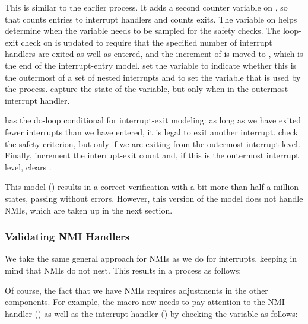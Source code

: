 \begin{fcvref}
This is similar to the earlier  process.
It adds a second counter variable  on , so that
 counts entries to interrupt handlers and 
counts exits.
The  variable on  helps determine
when the  variable needs to be sampled
for the safety checks.
The loop-exit check on  is updated to require that the
specified number of interrupt handlers are exited as well as entered,
and the increment of  is moved to , which is
the end of the interrupt-entry model.
 set the  variable to indicate
whether this is the outermost of a set of nested interrupts and to
set the  variable that is used by the
 process.
 capture the state of the 
variable, but only when in the outermost interrupt handler.

 has the do-loop conditional for interrupt-exit modeling:
as long as we have exited fewer interrupts than we have entered, it is
legal to exit another interrupt.
check the safety criterion, but only if we are exiting
from the outermost interrupt level.
Finally,  increment the interrupt-exit count 
and, if this is the outermost interrupt level, clears
.
\end{fcvref}

This model ()
results in a correct verification with a bit more than half a million
states, passing without errors.
However, this version of the model does not handle NMIs,
which are taken up in the next section.

\subsubsection{Validating NMI Handlers}
\label{sec:formal:Validating NMI Handlers}

We take the same general approach for NMIs as we do for interrupts,
keeping in mind that NMIs do not nest.
This results in a  process as follows:



Of course, the fact that we have NMIs requires adjustments in
the other components.
For example, the  macro now needs to
pay attention to the NMI handler () as well
as the interrupt handler () by checking
the  variable as follows:


